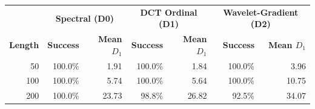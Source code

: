 \begin{tabular}{rrrrrrr}
\toprule
& \multicolumn{2}{c}{\textbf{Spectral (D0)}} & \multicolumn{2}{c}{\textbf{DCT Ordinal (D1)}} & \multicolumn{2}{c}{\textbf{Wavelet-Gradient (D2)}} \\
\textbf{Length} & \textbf{Success} & \textbf{Mean $D_1$} & \textbf{Success} & \textbf{Mean $D_1$} & \textbf{Success} & \textbf{Mean $D_1$} \\
\midrule
50 & 100.0\% & 1.91 & 100.0\% & 1.84 & 100.0\% & 3.96 \\
100 & 100.0\% & 5.74 & 100.0\% & 5.64 & 100.0\% & 10.75 \\
200 & 100.0\% & 23.73 & 98.8\% & 26.82 & 92.5\% & 34.07 \\
\bottomrule
\end{tabular}
